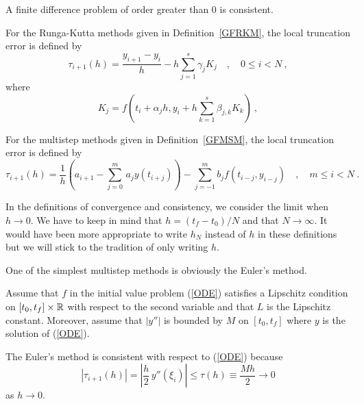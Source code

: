 A finite difference problem of order greater than $0$ is consistent.

For the Runga-Kutta methods given in Definition~\ref{GFRKM}, the
local truncation error is defined by
\[
\tau_{i+1}(h) = \frac{y_{i+1} - y_i}{h} - h \sum_{j=1}^s \gamma_j K_j
\quad, \quad 0 \leq i < N \ ,
\]
where
\[
K_j = f(t_i + \alpha_j h, y_i + h \sum_{k=1}^s \beta_{j,k} K_k) \ ,
\]

For the multistep methods given in Definition~\ref{GFMSM}, the
local truncation error is defined by
\[
\tau_{i+1}(h) = \frac{1}{h}\left( a_{i+1} -\sum_{j=0}^m\,a_j y(t_{i+j})\right)
- \sum_{j=-1}^m b_j f(t_{i-j},y_{i-j}) \quad, \quad m \leq i < N \ .
\]

\begin{rmk}
In the definitions of convergence and consistency, we consider the
limit when $h \to 0$.  We have to keep in mind that $h = (t_f-t_0)/N$
and that $N \to \infty$.  It would have been more appropriate to write
$h_N$ instead of $h$ in these definitions but we will stick to
the tradition of only writing $h$. \label{LinkhN}
\end{rmk}

\begin{egg}
One of the simplest multistep methods is obviously the Euler's method.
  
Assume that $f$ in the initial value problem (\ref{ODE}) satisfies a
Lipschitz condition on $[t_0,t_f]\times \mathbb{R}$ with respect to the
second variable and that $L$ is the Lipschitz constant.  Moreover, assume
that $|y''|$ is bounded by $M$ on $[t_0,t_f]$ where $y$ is the
solution of (\ref{ODE}).

The Euler's method is consistent with respect to (\ref{ODE})
because
\[
|\tau_{i+1}(h)| = \left|\frac{h}{2}\,y''(\xi_i) \right| \leq
\tau(h) \equiv \frac{Mh}{2} \rightarrow 0
\]
as $h \rightarrow 0$.
\end{egg}

